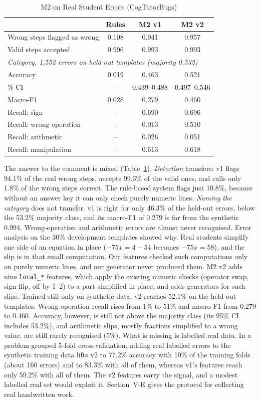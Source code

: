 \documentclass[conference]{IEEEtran}
\begin{document}
\begin{table}[!t]
\caption{M2 on Real Student Errors (CogTutorBugs)}
\label{tab:cogtutor}
\centering
\footnotesize
\setlength{\tabcolsep}{3.5pt}
\begin{tabular}{lccc}
\toprule
 & Rules & M2 v1 & M2 v2\\
\midrule
Wrong steps flagged as wrong & 0.108 & 0.941 & 0.957\\
Valid steps accepted & 0.996 & 0.993 & 0.993\\
\midrule
\multicolumn{4}{l}{\textit{Category, 1,552 errors on held-out templates (majority 0.532)}}\\
Accuracy & 0.019 & 0.463 & 0.521\\
\quad 95\% CI & -- & 0.439--0.488 & 0.497--0.546\\
Macro-F1 & 0.028 & 0.279 & 0.460\\
Recall: sign & -- & 0.690 & 0.696\\
Recall: wrong operation & -- & 0.013 & 0.510\\
Recall: arithmetic & -- & 0.026 & 0.051\\
Recall: manipulation & -- & 0.613 & 0.618\\
\bottomrule
\end{tabular}
\end{table}

The answer to the comment is mixed (Table~\ref{tab:cogtutor}). \textit{Detection} transfers: v1 flags 94.1\% of the real wrong steps, accepts 99.3\% of the valid ones, and calls only 1.8\% of the wrong steps correct. The rule-based system flags just 10.8\%, because without an answer key it can only check purely numeric lines. \textit{Naming the category} does not transfer. v1 is right for only 46.3\% of the held-out errors, below the 53.2\% majority class, and its macro-F1 of 0.279 is far from the synthetic 0.994. Wrong-operation and arithmetic errors are almost never recognised. Error analysis on the 30\% development templates showed why. Real students simplify one side of an equation in place ($-75x = 4 - 54$ becomes $-75x = 58$), and the slip is in that small computation. Our features checked such computations only on purely numeric lines, and our generator never produced them. M2 v2 adds nine \texttt{local\_*} features, which apply the existing numeric checks (operator swap, sign flip, off by 1--2) to a part simplified in place, and adds generators for such slips. Trained still only on synthetic data, v2 reaches 52.1\% on the held-out templates. Wrong-operation recall rises from 1\% to 51\% and macro-F1 from 0.279 to 0.460. Accuracy, however, is still not above the majority class (its 95\% CI includes 53.2\%), and arithmetic slips, mostly fractions simplified to a wrong value, are still rarely recognised (5\%). What is missing is labelled real data. In a problem-grouped 5-fold cross-validation, adding real labelled errors to the synthetic training data lifts v2 to 77.2\% accuracy with 10\% of the training folds (about 160 errors) and to 83.3\% with all of them, whereas v1's features reach only 59.2\% with all of them. The v2 features carry the signal, and a modest labelled real set would exploit it. Section~V-E gives the protocol for collecting real handwritten work.
\end{document}
